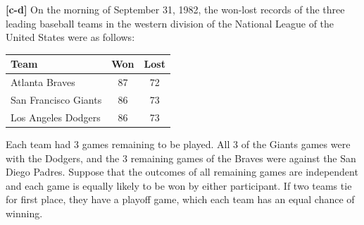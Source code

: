 \documentclass[twoside,10pt]{article}
\begin{document}
\vspace{1cm}



\textbf{[c-d]} On the morning of September 31, 1982, the won-lost records of the three leading baseball teams in the western division of the National League of the United States were as follows:

\begin{table}[!h]
\centering \small
\begin{tabular}{l|c|c}
  \hline
  Team & Won & Lost\\
  \hline \hline
  Atlanta Braves & 87 & 72\\
  San Francisco Giants & 86 & 73\\
  Los Angeles Dodgers & 86 & 73\\
  \hline
\end{tabular}
\end{table}

Each team had 3 games remaining to be played. All 3 of the Giants games were with the Dodgers, and the 3 remaining games of the Braves were against the San Diego Padres. Suppose that the outcomes of all remaining games are independent and each game is equally likely to be won by either participant. If two teams tie for first place, they have a playoff game, which each team has an equal chance of winning.


\vspace{1cm}
\end{document}
